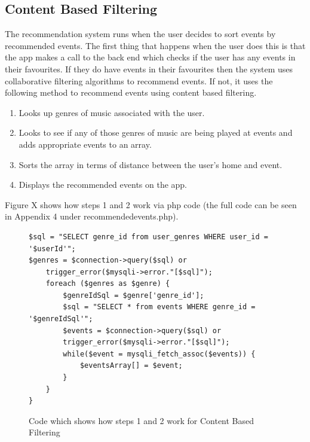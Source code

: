 \subsection{Content Based Filtering}
The recommendation system runs when the user decides to sort events by recommended events. The first thing that happens when the user does this is that the app makes a call to the back end which checks if the user has any events in their favourites. If they do have events in their favourites then the system uses collaborative filtering algorithms to recommend events. If not, it uses the following method to recommend events using content based filtering.
\begin{enumerate}
  \item Looks up genres of music associated with the user.
  \item Looks to see if any of those genres of music are being played at events and adds appropriate events to an array.
  \item Sorts the array in terms of distance between the user's home and event.
  \item Displays the recommended events on the app.
\end{enumerate}
Figure X shows how steps 1 and 2 work via php code (the full code can be seen in Appendix 4 under recommendedevents.php).
\begin{figure}[H]
\begin{verbatim}
$sql = "SELECT genre_id from user_genres WHERE user_id = '$userId'";
$genres = $connection->query($sql) or 
    trigger_error($mysqli->error."[$sql]");
    foreach ($genres as $genre) {
        $genreIdSql = $genre['genre_id'];
        $sql = "SELECT * from events WHERE genre_id = '$genreIdSql'";
        $events = $connection->query($sql) or 
        trigger_error($mysqli->error."[$sql]");
        while($event = mysqli_fetch_assoc($events)) {
            $eventsArray[] = $event;
        }
    }
}
\end{verbatim}
\caption{Code which shows how steps 1 and 2 work for Content Based Filtering}
\end{figure}

